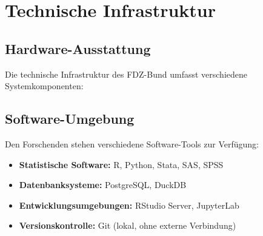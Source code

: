\documentclass[
  ngerman,
  10pt,
  letterpaper,
  twocolumn]{book}
\providecommand{\tightlist}{%
  \setlength{\itemsep}{0pt}\setlength{\parskip}{0pt}}
\let\origtable\table
\let\endorigtable\endtable
\renewenvironment{table}[1][htbp]{%
  \origtable*[#1]%
}{%
  \endorigtable*%
}
\begin{document}
\section{Technische Infrastruktur}\label{technische-infrastruktur}

\subsection{Hardware-Ausstattung}\label{hardware-ausstattung}

Die technische Infrastruktur des FDZ-Bund umfasst verschiedene
Systemkomponenten:

\begin{table}

\caption{\label{tbl-fdz-infrastructure}Technische Ausstattung des
FDZ-Bund (beispielhafte Konfiguration)}


\end{table}%

\subsection{Software-Umgebung}\label{software-umgebung}

Den Forschenden stehen verschiedene Software-Tools zur Verfügung:

\begin{itemize}
\tightlist
\item
  \textbf{Statistische Software:} R, Python, Stata, SAS, SPSS
\item
  \textbf{Datenbanksysteme:} PostgreSQL, DuckDB
\item
  \textbf{Entwicklungsumgebungen:} RStudio Server, JupyterLab
\item
  \textbf{Versionskontrolle:} Git (lokal, ohne externe Verbindung)
\end{itemize}
\end{document}
